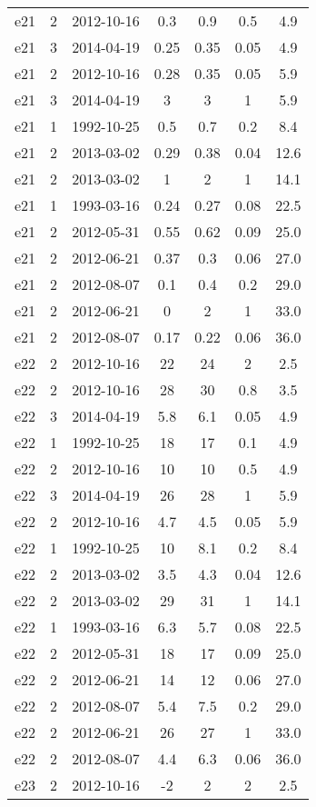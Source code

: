 \begin{table*}[htp]
\begin{tabular}{ccccccc}
e21 & 2 & 2012-10-16 & 0.3 & 0.9 & 0.5 & 4.9 \\
e21 & 3 & 2014-04-19 & 0.25 & 0.35 & 0.05 & 4.9 \\
e21 & 2 & 2012-10-16 & 0.28 & 0.35 & 0.05 & 5.9 \\
e21 & 3 & 2014-04-19 & 3 & 3 & 1 & 5.9 \\
e21 & 1 & 1992-10-25 & 0.5 & 0.7 & 0.2 & 8.4 \\
e21 & 2 & 2013-03-02 & 0.29 & 0.38 & 0.04 & 12.6 \\
e21 & 2 & 2013-03-02 & 1 & 2 & 1 & 14.1 \\
e21 & 1 & 1993-03-16 & 0.24 & 0.27 & 0.08 & 22.5 \\
e21 & 2 & 2012-05-31 & 0.55 & 0.62 & 0.09 & 25.0 \\
e21 & 2 & 2012-06-21 & 0.37 & 0.3 & 0.06 & 27.0 \\
e21 & 2 & 2012-08-07 & 0.1 & 0.4 & 0.2 & 29.0 \\
e21 & 2 & 2012-06-21 & 0 & 2 & 1 & 33.0 \\
e21 & 2 & 2012-08-07 & 0.17 & 0.22 & 0.06 & 36.0 \\
e22 & 2 & 2012-10-16 & 22 & 24 & 2 & 2.5 \\
e22 & 2 & 2012-10-16 & 28 & 30 & 0.8 & 3.5 \\
e22 & 3 & 2014-04-19 & 5.8 & 6.1 & 0.05 & 4.9 \\
e22 & 1 & 1992-10-25 & 18 & 17 & 0.1 & 4.9 \\
e22 & 2 & 2012-10-16 & 10 & 10 & 0.5 & 4.9 \\
e22 & 3 & 2014-04-19 & 26 & 28 & 1 & 5.9 \\
e22 & 2 & 2012-10-16 & 4.7 & 4.5 & 0.05 & 5.9 \\
e22 & 1 & 1992-10-25 & 10 & 8.1 & 0.2 & 8.4 \\
e22 & 2 & 2013-03-02 & 3.5 & 4.3 & 0.04 & 12.6 \\
e22 & 2 & 2013-03-02 & 29 & 31 & 1 & 14.1 \\
e22 & 1 & 1993-03-16 & 6.3 & 5.7 & 0.08 & 22.5 \\
e22 & 2 & 2012-05-31 & 18 & 17 & 0.09 & 25.0 \\
e22 & 2 & 2012-06-21 & 14 & 12 & 0.06 & 27.0 \\
e22 & 2 & 2012-08-07 & 5.4 & 7.5 & 0.2 & 29.0 \\
e22 & 2 & 2012-06-21 & 26 & 27 & 1 & 33.0 \\
e22 & 2 & 2012-08-07 & 4.4 & 6.3 & 0.06 & 36.0 \\
e23 & 2 & 2012-10-16 & -2 & 2 & 2 & 2.5 \\

\end{tabular}
\end{table*}
